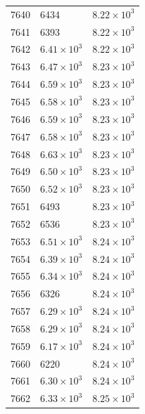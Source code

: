 \begin{table}[H]
\begin{tabular}{lll}
7640 & 6434 & $\displaystyle 8.22 \times 10^{3}$ \\
7641 & 6393 & $\displaystyle 8.22 \times 10^{3}$ \\
7642 & $\displaystyle 6.41 \times 10^{3}$ & $\displaystyle 8.22 \times 10^{3}$ \\
7643 & $\displaystyle 6.47 \times 10^{3}$ & $\displaystyle 8.23 \times 10^{3}$ \\
7644 & $\displaystyle 6.59 \times 10^{3}$ & $\displaystyle 8.23 \times 10^{3}$ \\
7645 & $\displaystyle 6.58 \times 10^{3}$ & $\displaystyle 8.23 \times 10^{3}$ \\
7646 & $\displaystyle 6.59 \times 10^{3}$ & $\displaystyle 8.23 \times 10^{3}$ \\
7647 & $\displaystyle 6.58 \times 10^{3}$ & $\displaystyle 8.23 \times 10^{3}$ \\
7648 & $\displaystyle 6.63 \times 10^{3}$ & $\displaystyle 8.23 \times 10^{3}$ \\
7649 & $\displaystyle 6.50 \times 10^{3}$ & $\displaystyle 8.23 \times 10^{3}$ \\
7650 & $\displaystyle 6.52 \times 10^{3}$ & $\displaystyle 8.23 \times 10^{3}$ \\
7651 & 6493 & $\displaystyle 8.23 \times 10^{3}$ \\
7652 & 6536 & $\displaystyle 8.23 \times 10^{3}$ \\
7653 & $\displaystyle 6.51 \times 10^{3}$ & $\displaystyle 8.24 \times 10^{3}$ \\
7654 & $\displaystyle 6.39 \times 10^{3}$ & $\displaystyle 8.24 \times 10^{3}$ \\
7655 & $\displaystyle 6.34 \times 10^{3}$ & $\displaystyle 8.24 \times 10^{3}$ \\
7656 & 6326 & $\displaystyle 8.24 \times 10^{3}$ \\
7657 & $\displaystyle 6.29 \times 10^{3}$ & $\displaystyle 8.24 \times 10^{3}$ \\
7658 & $\displaystyle 6.29 \times 10^{3}$ & $\displaystyle 8.24 \times 10^{3}$ \\
7659 & $\displaystyle 6.17 \times 10^{3}$ & $\displaystyle 8.24 \times 10^{3}$ \\
7660 & 6220 & $\displaystyle 8.24 \times 10^{3}$ \\
7661 & $\displaystyle 6.30 \times 10^{3}$ & $\displaystyle 8.24 \times 10^{3}$ \\
7662 & $\displaystyle 6.33 \times 10^{3}$ & $\displaystyle 8.25 \times 10^{3}$ \\

\end{tabular}
\end{table}
